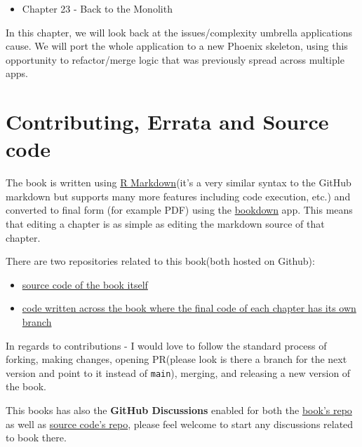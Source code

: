 \documentclass[
  oneside]{book}
\providecommand{\tightlist}{%
  \setlength{\itemsep}{0pt}\setlength{\parskip}{0pt}}
\begin{document}
\begin{itemize}
\tightlist
\item
  Chapter 23 - Back to the Monolith
\end{itemize}

In this chapter, we will look back at the issues/complexity umbrella applications cause. We will port the whole application to a new Phoenix skeleton, using this opportunity to refactor/merge logic that was previously spread across multiple apps.

\section*{Contributing, Errata and Source code}\label{contributing-errata-and-source-code}

The book is written using \href{http://rmarkdown.rstudio.com/}{R Markdown}(it's a very similar syntax to the GitHub markdown but supports many more features including code execution, etc.) and converted to final form (for example PDF) using the \href{https://www.bookdown.org/}{bookdown} app. This means that editing a chapter is as simple as editing the markdown source of that chapter.

There are two repositories related to this book(both hosted on Github):

\begin{itemize}
\tightlist
\item
  \href{https://github.com/Cinderella-Man/hands-on-elixir-and-otp-cryptocurrency-trading-bot}{source code of the book itself}
\item
  \href{https://github.com/Cinderella-Man/hands-on-elixir-and-otp-cryptocurrency-trading-bot-source-code}{code written across the book where the final code of each chapter has its own branch}
\end{itemize}

In regards to contributions - I would love to follow the standard process of forking, making changes, opening PR(please look is there a branch for the next version and point to it instead of \texttt{main}), merging, and releasing a new version of the book.

This books has also the \textbf{GitHub Discussions} enabled for both the \href{https://github.com/Cinderella-Man/hands-on-elixir-and-otp-cryptocurrency-trading-bot/discussions}{book's repo} as well as \href{https://github.com/Cinderella-Man/hands-on-elixir-and-otp-cryptocurrency-trading-bot-source-code/discussions}{source code's repo}, please feel welcome to start any discussions related to book there.
\end{document}
